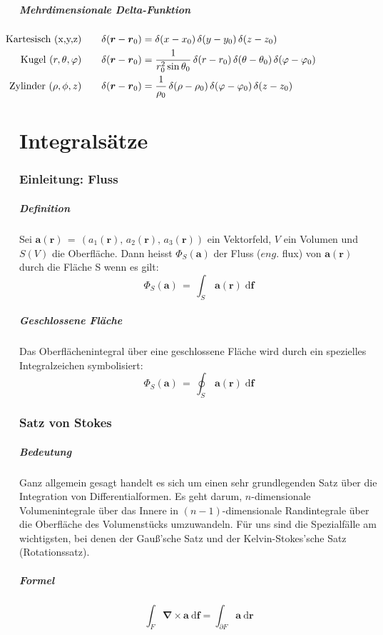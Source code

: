 \documentclass[titlepage,11pt,a4paper,ngerman]{report}
\renewcommand{\vec}[1]{\boldsymbol{#1}}
\newcommand{\vabla}{\boldsymbol{\nabla}}
\renewcommand{\paragraph}[1]{\subsubsection{#1}}
\begin{document}
\subparagraph{Mehrdimensionale Delta-Funktion}
\begin{align*}
\llap{\text{Kartesisch (x,y,z)}} \qquad \delta(\vec{r} - \vec{r}_0) &= \delta(x - x_0) \, \delta(y - y_0) \, \delta(z - z_0) \\
\llap{\text{Kugel $ (r, \theta, \varphi) $}} \qquad \delta(\vec{r} - \vec{r}_0) &= \frac{1}{r^2_0 \sin\theta_0} \, \delta(r - r_0) \, \delta(\theta - \theta _0) \, \delta(\varphi - \varphi _0) \\
\llap{\text{Zylinder $ (\rho , \phi , z) $}} \qquad \delta(\vec{r} - \vec{r}_0) &= \frac{1}{\rho _0} \, \delta(\rho - \rho _0) \, \delta(\varphi - \varphi _0) \, \delta(z - z _0)
\end{align*}

\section{Integralsätze}
\paragraph{Einleitung: Fluss}
\subparagraph{Definition}
Sei $\vec{a}(\vec{r})\,=\,(a_1(\vec{r}),\,a_2(\vec{r}),\, a_3(\vec{r}))$ ein Vektorfeld, $V$ ein Volumen und $S(V)$ die Oberfläche. Dann heisst $\Phi_S(\vec{a})$ der Fluss ($eng.$ flux) von $\vec{a}(\vec{r})$ durch die Fläche S wenn es gilt:
\hfill \break
\[\Phi_S(\vec{a})\,=\,\int_{S}\,\vec{a}(\vec{r})\;\mathrm{d}\vec{f}\]

\subparagraph{Geschlossene Fläche} Das Oberflächenintegral über eine geschlossene Fläche wird durch ein spezielles Integralzeichen symbolisiert:
\[\Phi_S(\vec{a})\,=\,\oint_S\,\vec{a}(\vec{r})\;\mathrm{d}\vec{f}\]

\paragraph{Satz von Stokes}
\subparagraph{Bedeutung}
Ganz allgemein gesagt handelt es sich um einen sehr grundlegenden Satz über die Integration von Differentialformen. Es geht darum, $n$-dimensionale Volumenintegrale über das Innere in $(n-1)$-dimensionale Randintegrale über die Oberfläche des Volumenstücks umzuwandeln. Für uns sind die Spezialfälle am wichtigsten, bei denen der Gauß'sche Satz und der Kelvin-Stokes'sche Satz (Rotationssatz).

\subparagraph{Formel}
$$\int_{F} \vabla \times \vec{a}\ \mathrm{d}\vec{f} = \int_{\partial F}\vec{a}\ \mathrm{d}\vec{r}$$
\hfill \break
\end{document}
